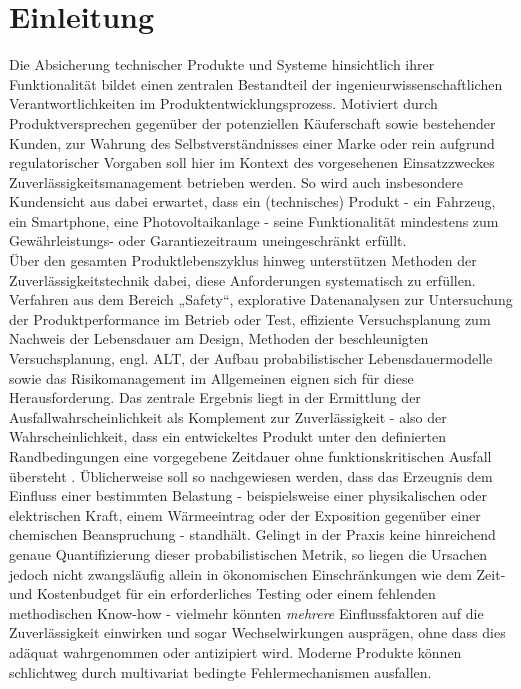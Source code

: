 
\chapter{Einleitung} \label{chap:einleitung}
Die Absicherung technischer Produkte und Systeme hinsichtlich ihrer Funktionalität bildet einen zentralen Bestandteil der ingenieurwissenschaftlichen Verantwortlichkeiten im Produktentwicklungsprozess.
Motiviert durch  Produktversprechen gegenüber der potenziellen Käuferschaft sowie bestehender Kunden, zur Wahrung des Selbstverständnisses einer Marke oder rein aufgrund regulatorischer Vorgaben soll hier im Kontext des vorgesehenen Einsatzzweckes Zuverlässigkeitsmanagement betrieben werden.
So wird auch insbesondere Kundensicht aus dabei erwartet, dass ein (technisches) Produkt - ein Fahrzeug, ein Smartphone, eine Photovoltaikanlage - seine Funktionalität mindestens zum Gewährleistungs- oder Garantiezeitraum uneingeschränkt erfüllt.\\
Über den gesamten Produktlebenszyklus hinweg unterstützen Methoden der Zuverlässigkeitstechnik dabei, diese Anforderungen systematisch zu erfüllen.
Verfahren aus dem Bereich „Safety“, explorative Datenanalysen zur Untersuchung der Produktperformance im Betrieb oder Test, effiziente Versuchsplanung zum Nachweis der Lebensdauer am Design, Methoden der beschleunigten Versuchsplanung, engl. \ac{ALT}, der Aufbau probabilistischer Lebensdauermodelle sowie das Risikomanagement im Allgemeinen eignen sich für diese Herausforderung.
Das zentrale Ergebnis liegt in der Ermittlung der Ausfallwahrscheinlichkeit als Komplement zur Zuverlässigkeit - also der Wahrscheinlichkeit, dass ein entwickeltes Produkt unter den definierten Randbedingungen eine vorgegebene Zeitdauer ohne funktionskritischen Ausfall übersteht \cite{Bertsche.2022}.
Üblicherweise soll so nachgewiesen werden, dass das Erzeugnis dem Einfluss einer bestimmten Belastung - beispielsweise einer physikalischen oder elektrischen Kraft, einem Wärmeeintrag oder der Exposition gegenüber einer chemischen Beanspruchung - standhält.
Gelingt in der Praxis keine hinreichend genaue Quantifizierung dieser probabilistischen Metrik, so liegen die Ursachen jedoch nicht zwangsläufig allein in ökonomischen Einschränkungen wie dem Zeit- und Kostenbudget für ein erforderliches Testing oder einem fehlenden methodischen Know-how - vielmehr könnten  \textit{mehrere} Einflussfaktoren auf die Zuverlässigkeit einwirken und sogar Wechselwirkungen ausprägen, ohne dass dies adäquat wahrgenommen oder antizipiert wird.
Moderne Produkte können schlichtweg durch multivariat bedingte Fehlermechanismen ausfallen.

